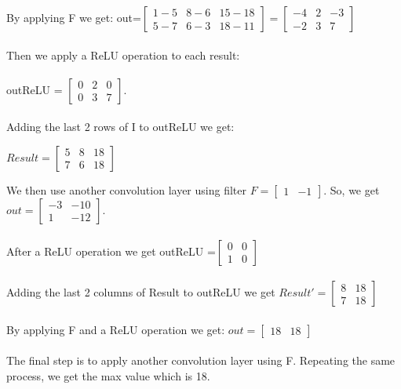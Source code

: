 \documentclass{article}
\begin{document}
\begin{enumerate} [label=\Alph*]
            By applying F we get: out=$ 
            \begin{bmatrix}
              1-5& 8-6 & 15-18 \\
              5-7& 6-3 &18-11             
            \end{bmatrix} =\begin{bmatrix}
              -4 & 2 & -3\\
              -2 & 3 & 7
            \end{bmatrix}$ 
            \\ \\ Then we apply a ReLU operation to each result: \\ \\
            outReLU = $
            \begin{bmatrix}
              0 & 2 & 0\\
              0 & 3 & 7
            \end{bmatrix}$. \\\\Adding the last 2 rows of I to outReLU we get:
             
            $Result = \begin{bmatrix}
              5 & 8 & 18 \\
              7 & 6 & 18
            \end{bmatrix}$ 

            We then use another convolution layer using filter
            $F = \begin{bmatrix}
              1 & -1
            \end{bmatrix}$.
            So, we get $out = \begin{bmatrix}
                -3 & -10 \\
                1 & -12
              \end{bmatrix}$. \\ \\ After a ReLU operation we get outReLU =$\begin{bmatrix}
                0& 0 \\
                1 & 0
              \end{bmatrix}$\\ \\Adding the last 2 columns of Result to outReLU we get $Result' =\begin{bmatrix}
                8 & 18 \\
                7 & 18
              \end{bmatrix}$
            \\\\ By applying F and a ReLU operation we get:
            $out = \begin{bmatrix}
              18 & 18
            \end{bmatrix}$ 
            \\\\ The final step is to apply another convolution layer using F. Repeating the same process, we get the max value which is 18.
            

\end{enumerate}
\end{document}
